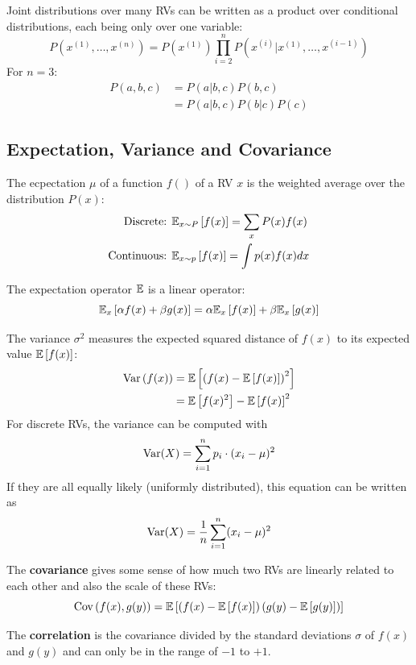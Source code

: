 \begin{multicols}{2}
	Joint distributions over many RVs can be written as a product over conditional distributions, each being only over one variable:
	\[ P\left(x^{(1)},\dots,x^{(n)}\right) = P(x^{(1)}) \prod_{i=2}^{n} P\left( x^{(i)}|x^{(1)},\dots,x^{(i-1)} \right) \]
	For $n=3$:
	\begin{align*}
	P(a,b,c)
	&= P(a|b,c)P(b,c)\\
	&= P(a|b,c)P(b|c)P(c)
	\end{align*}

	\subsection{Expectation, Variance and Covariance}
	The ecpectation $\mu$ of a function $f()$ of a RV $x$ is the weighted average over the distribution $P(x)$:
	\begin{align*}
	\text{Discrete: }  &\mathbb{E}_{x\sim P}\left[f(x)\right] = \sum_x P(x)f(x)\\
	\text{Continuous: }  &\mathbb{E}_{x\sim p}\left[f(x)\right] = \int p(x)f(x)dx
	\end{align*}

	The expectation operator $\mathbb{E}$ is a linear operator:
	\[ \mathbb{E}_x \left[ \alpha f(x) + \beta g(x) \right] = \alpha\mathbb{E}_x \left[f(x)\right] + \beta\mathbb{E}_x \left[g(x)\right]\]

	The variance $\sigma^2$ measures the expected squared distance of $f(x)$ to its expected value $\mathbb{E}\left[f(x)\right]$:
	\begin{align*}
	\text{Var}\left( f(x) \right) &= \mathbb{E} \left[ \left( f(x) - \mathbb{E} \left[ f(x) \right] \right)^2 \right]\\
	&= \mathbb{E} \left[ f(x)^2 \right] - \mathbb{E} \left[ f(x) \right]^2
	\end{align*}
	For discrete RVs, the variance can be computed with
	\[ \text{Var}(X) = \sum_{i=1}^{n} p_i \cdot (x_i-\mu)^2 \]
	If they are all equally likely (uniformly distributed), this equation can be written as
	\[ \text{Var}(X) = \frac{1}{n} \sum_{i=1}^{n} (x_i-\mu )^2 \]

	The \textbf{covariance} gives some sense of how much two RVs are linearly related to each other and also the scale of these RVs:
	\[ \text{Cov}\left( f(x),g(y) \right) =
	\mathbb{E} \left[ \left( f(x) -\mathbb{E} \left[ f(x) \right] \right)\left( g(y) -\mathbb{E} \left[ g(y) \right] \right) \right] \]

	The \textbf{correlation} is the covariance divided by the standard deviations $\sigma$ of $f(x)$ and $g(y)$ and can only be in the range of $-1$ to $+1$.\\


\end{multicols}
